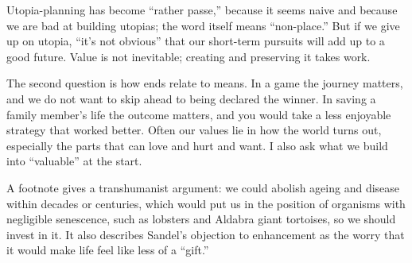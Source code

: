 Utopia-planning has become ``rather passe,'' because it seems naive and because we are bad at building utopias; the word itself means ``non-place.'' But if we give up on utopia, ``it's not obvious'' that our short-term pursuits will add up to a good future. Value is not inevitable; creating and preserving it takes work. 

The second question is how ends relate to means. In a game the journey matters, and we do not want to skip ahead to being declared the winner. In saving a family member's life the outcome matters, and you would take a less enjoyable strategy that worked better. Often our values lie in how the world turns out, especially the parts that can love and hurt and want. I also ask what we build into ``valuable'' at the start.

A footnote gives a transhumanist argument: we could abolish ageing and disease within decades or centuries, which would put us in the position of organisms with negligible senescence, such as lobsters and Aldabra giant tortoises, so we should invest in it. It also describes Sandel's objection to enhancement as the worry that it would make life feel like less of a ``gift.'' 
